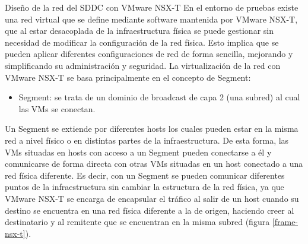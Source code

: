 

\begin{subsubsection}{Diseño de la red del SDDC con VMware NSX-T}
    En el entorno de pruebas existe una red virtual que se define mediante software mantenida por VMware NSX-T, que al estar desacoplada de la infraestructura física se puede gestionar sin necesidad de modificar la configuración de la red física. Esto implica que se pueden aplicar diferentes configuraciones de red de forma sencilla, mejorando y simplificando su administración y seguridad. La virtualización de la red con VMware NSX-T se basa principalmente en el concepto de Segment:
    \begin{itemize}
        \item Segment: se trata de un dominio de broadcast de capa 2 (una subred) al cual las VMs se conectan.
    \end{itemize}
    Un Segment se extiende por diferentes hosts los cuales pueden estar en la misma red a nivel físico o en distintas partes de la infraestructura. De esta forma, las VMs situadas en hosts con acceso a un Segment pueden conectarse a él y comunicarse de forma directa con otras VMs situadas en un host conectado a una red física diferente. Es decir, con un Segment se pueden comunicar diferentes puntos de la infraestructura sin cambiar la estructura de la red física, ya que VMware NSX-T se encarga de encapsular el tráfico al salir de un host cuando su destino se encuentra en una red física diferente a la de origen, haciendo creer al destinatario y al remitente que se encuentran en la misma subred (figura \ref{frame-nsx-t}).

\end{subsubsection}
